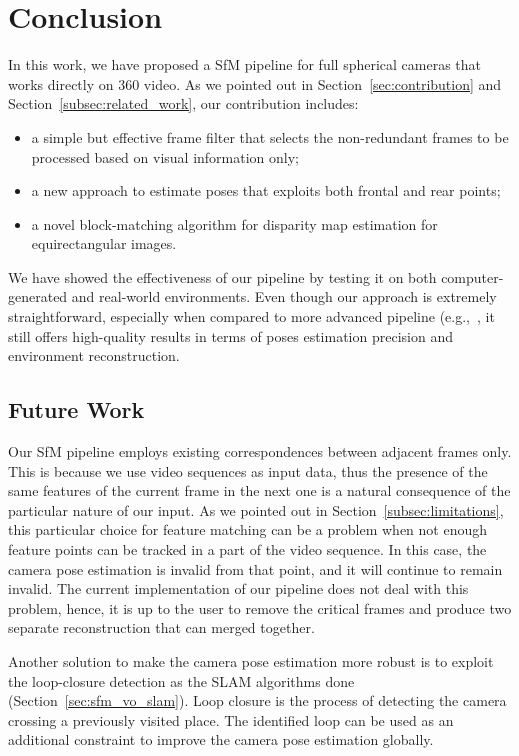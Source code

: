 \chapter{Conclusion}

In this work, we have proposed a SfM pipeline for full spherical cameras that works directly on 360 video.
As we pointed out in Section~\ref{sec:contribution} and
Section~\ref{subsec:related_work}, our contribution includes:
%
\begin{itemize}
	\item a simple but effective frame filter that selects the non-redundant frames to be processed based on visual
	information only;
	\item a new approach to estimate poses that exploits both frontal and rear
	points;
	\item a novel block-matching algorithm for disparity map estimation for
	equirectangular images.
\end{itemize}
%
We have showed the effectiveness of our pipeline by testing it on 
both computer-generated and real-world environments.
Even though our approach is extremely straightforward, especially when compared to more advanced pipeline (e.g.,~\cite{schonberger2016structure}, it still offers high-quality results in terms of
poses estimation precision and environment reconstruction.

\section{Future Work}\label{sec:future_work}
Our SfM pipeline employs existing correspondences between adjacent frames only.
This is because we use video sequences as input data, thus the presence of
the same features of the current frame in the next one is a natural consequence
of the particular nature of our input.
As we pointed out in Section~\ref{subsec:limitations}, this particular choice
for feature matching can be a problem when not enough feature points can be
tracked in a part of the video sequence. In this case, the camera pose
estimation is invalid from that point, and it will continue to remain invalid.
The current implementation of our pipeline does not deal with this problem,
hence, it is up to the user to remove the critical frames and produce two
separate reconstruction that can merged together.

Another solution to make the camera pose estimation more robust is to 
exploit the loop-closure detection as the SLAM algorithms done (Section~\ref{sec:sfm_vo_slam}).
Loop closure is the process of detecting the camera crossing a previously
visited place. The identified loop can be used as an additional constraint
to improve the camera pose estimation globally.

